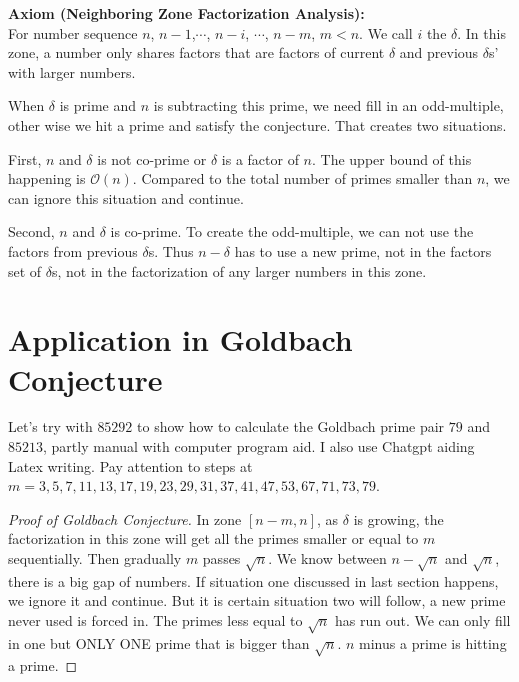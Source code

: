 \documentclass{article}
\begin{document}
\noindent \textbf{Axiom (Neighboring Zone Factorization Analysis):} \\
For number sequence $n$, $n-1$,$\cdots $, $n-i$, $\cdots $, $n-m$, $m < n$. We call $i$ the $\delta $. In this zone, a number only shares factors that are factors of current $\delta $ and previous $\delta$s' with larger numbers.
\bigskip

When $\delta $ is prime and $n$ is subtracting this prime, we need fill in an odd-multiple, other wise we hit a prime and satisfy the conjecture. That creates two situations. 
\bigskip

First, $n$ and $\delta$ is not co-prime or $\delta$ is a factor of $n$. The upper bound of this happening is $\mathcal{O}(n)$. Compared to the total number of primes smaller than $n$, we can ignore this situation and continue.
\bigskip

Second, $n$ and $\delta$ is co-prime. To create the odd-multiple, we can not use the factors from previous $\delta $s. Thus $n - \delta $ has to use a new prime, not in the factors set of $\delta$s, not in the factorization of any larger numbers in this zone.
\bigskip

\newpage
\section{Application in Goldbach Conjecture}
Let's try with $85292$ to show how to calculate the Goldbach prime pair $79$ and $85213$, partly manual with computer program aid. I also use Chatgpt aiding Latex writing. Pay attention to steps at $m=3,5,7,11,13,17,19,23,29,31,37,41,47,53,67,71,73,79$.

\begin{proof}[Proof of Goldbach Conjecture]
In zone $[n-m,n]$, as $\delta$ is growing, the factorization in this zone will get all the primes smaller or equal to $m$ sequentially. Then gradually $m$ passes $\sqrt n$. We know between $n - \sqrt n$ and $\sqrt n$, there is a big gap of numbers. If situation one discussed in last section happens, we ignore it and continue. But it is certain situation two will follow, a new prime never used is forced in. The primes less equal to $\sqrt n$ has run out. We can only fill in one but ONLY ONE prime that is bigger than $\sqrt n$. $n$ minus a prime is hitting a prime.
\end{proof}
\end{document}
